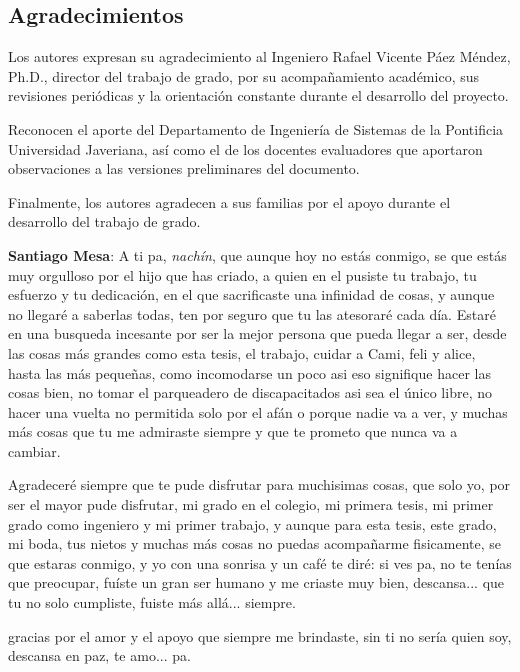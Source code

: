 \newpage
\thispagestyle{empty}
\begin{center}
\section*{Agradecimientos}
\end{center}

Los autores expresan su agradecimiento al Ingeniero Rafael Vicente Páez Méndez, Ph.D., director del trabajo
de grado, 
por su acompañamiento académico, sus revisiones periódicas y la orientación constante durante el desarrollo
del proyecto.

Reconocen el aporte del Departamento de Ingeniería de Sistemas de la Pontificia Universidad Javeriana, así
como el 
de los docentes evaluadores que aportaron observaciones a las versiones preliminares del documento.

Finalmente, los autores agradecen a sus familias por el apoyo durante el desarrollo del trabajo de grado.

\textbf{Santiago Mesa}: A ti pa, \textit{nachín}, que aunque hoy no estás conmigo, se que estás muy orgulloso por
el hijo que has criado, a quien en el pusiste tu trabajo, tu esfuerzo y tu dedicación, en el que sacrificaste 
una infinidad de cosas, y aunque no llegaré a saberlas todas, ten por seguro que tu las atesoraré cada día.
Estaré en una busqueda incesante por ser la mejor persona que pueda llegar a ser, desde las cosas 
más grandes como esta tesis, el trabajo, cuidar a Cami, feli y alice, hasta las más pequeñas, como incomodarse
un poco asi eso signifique hacer las cosas bien, no tomar el parqueadero de discapacitados asi sea el único libre,
no hacer una vuelta no permitida solo por el afán o porque nadie va a ver, y muchas más cosas que tu me admiraste 
siempre y que te prometo que nunca va a cambiar. 

Agradeceré siempre que te pude disfrutar para muchisimas cosas, que solo yo, por ser el mayor pude disfrutar, mi 
grado en el  colegio, mi primera tesis, mi primer grado como ingeniero y mi primer trabajo, y aunque para esta 
tesis, este grado, mi boda, tus nietos y muchas más cosas no puedas acompañarme fisicamente, se que estaras conmigo, 
y yo con una sonrisa y un café te diré: si ves pa, no te tenías que preocupar, fuíste un gran ser humano y me criaste
muy bien, descansa... que tu no solo cumpliste, fuiste más allá... siempre.

gracias por el amor y el apoyo que siempre me brindaste, sin ti no sería quien soy, descansa en paz, te amo... pa.

